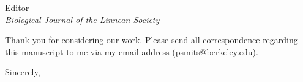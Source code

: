 \documentclass{letter}
\begin{document}
\begin{letter}{Editor \\ \textit{Biological Journal of the Linnean Society}}

  Thank you for considering our work. Please send all correspondence regarding this manuscript to me via my email address (psmits@berkeley.edu).

  \closing{Sincerely,}


\end{letter}
\end{document}
